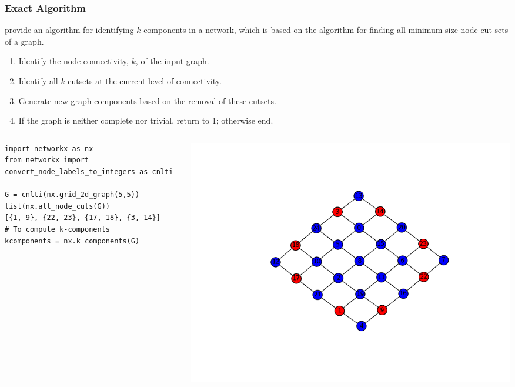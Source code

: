 \documentclass[ignorenonframetext,red,8pt,notes=hide]{beamer}
\begin{document}
\begin{frame}[fragile]
\frametitle{Exact Algorithm}

\citet[appendix A]{moody:2003} provide an algorithm for identifying $k$-components in a network, which is based on the \citet{kanevsky:1993} algorithm for finding all minimum-size node cut-sets of a graph.

\begin{enumerate}

\item Identify the node connectivity, $k$, of the input graph.

\item Identify all $k$-cutsets at the current level of connectivity.

\item Generate new graph components based on the removal of these cutsets.

\item If the graph is neither complete nor trivial, return to 1; otherwise end.

\end{enumerate}


\begin{columns}[c]
\begin{column}{0.3\textwidth}
\begin{scriptsize}
\begin{lstlisting}
import networkx as nx
from networkx import convert_node_labels_to_integers as cnlti

G = cnlti(nx.grid_2d_graph(5,5))
list(nx.all_node_cuts(G))
[{1, 9}, {22, 23}, {17, 18}, {3, 14}]
# To compute k-components
kcomponents = nx.k_components(G)
\end{lstlisting}
\end{scriptsize}

\end{column}

\begin{column}{0.7\textwidth}
\begin{center}
\includegraphics[scale=0.45]{img/grid}
\end{center}

\end{column}
\end{columns}

\end{frame}
\end{document}
